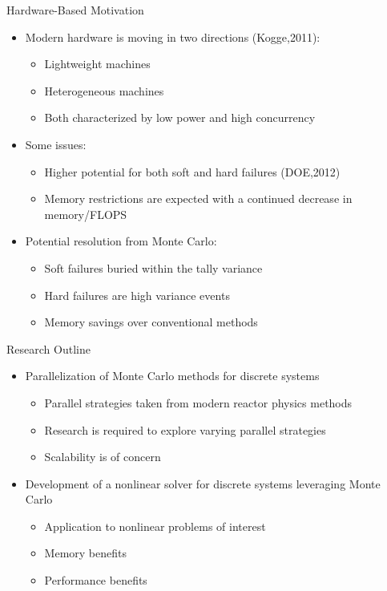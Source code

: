 \documentclass{beamer}
\begin{document}
\begin{frame}{Hardware-Based Motivation}

  \begin{itemize}
  \item Modern hardware is moving in two directions (Kogge,2011):
    \begin{itemize}
    \item Lightweight machines
    \item Heterogeneous machines
    \item Both characterized by low power and high concurrency
    \end{itemize}
    \medskip \medskip
  \item Some issues:
    \begin{itemize}
    \item Higher potential for both soft and hard failures (DOE,2012)
    \item Memory restrictions are expected with a continued decrease
      in memory/FLOPS
    \end{itemize}
    \medskip \medskip
  \item Potential resolution from Monte Carlo:
    \begin{itemize}
    \item Soft failures buried within the tally variance
    \item Hard failures are high variance events
    \item Memory savings over conventional methods
    \end{itemize}
  \end{itemize}

\end{frame}

\begin{frame}{Research Outline}
  \begin{itemize}
  \item Parallelization of Monte Carlo methods for discrete systems
    \begin{itemize}
    \item Parallel strategies taken from modern reactor physics
      methods
    \item Research is required to explore varying parallel strategies
    \item Scalability is of concern
    \end{itemize}
    \medskip \medskip \medskip
  \item Development of a nonlinear solver for discrete systems
    leveraging Monte Carlo
    \begin{itemize}
    \item Application to nonlinear problems of interest
    \item Memory benefits
    \item Performance benefits
    \end{itemize}
  \end{itemize}
\end{frame}
\end{document}
